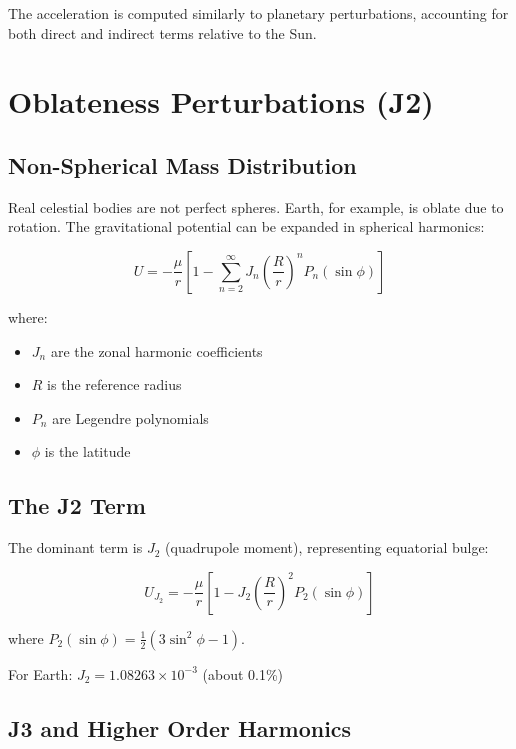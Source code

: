 The acceleration is computed similarly to planetary perturbations, accounting for both direct and indirect terms relative to the Sun.

\section{Oblateness Perturbations (J2)}

\subsection{Non-Spherical Mass Distribution}

Real celestial bodies are not perfect spheres. Earth, for example, is oblate due to rotation. The gravitational potential can be expanded in spherical harmonics:

\begin{equation}
    U = -\frac{\mu}{r}\left[1 - \sum_{n=2}^{\infty} J_n \left(\frac{R}{r}\right)^n P_n(\sin\phi)\right]
\end{equation}

where:
\begin{itemize}
    \item $J_n$ are the zonal harmonic coefficients
    \item $R$ is the reference radius
    \item $P_n$ are Legendre polynomials
    \item $\phi$ is the latitude
\end{itemize}

\subsection{The J2 Term}

The dominant term is $J_2$ (quadrupole moment), representing equatorial bulge:

\begin{equation}
    U_{J_2} = -\frac{\mu}{r}\left[1 - J_2 \left(\frac{R}{r}\right)^2 P_2(\sin\phi)\right]
\end{equation}

where $P_2(\sin\phi) = \frac{1}{2}(3\sin^2\phi - 1)$.

For Earth: $J_2 = 1.08263 \times 10^{-3}$ (about 0.1\%)

\subsection{J3 and Higher Order Harmonics}

